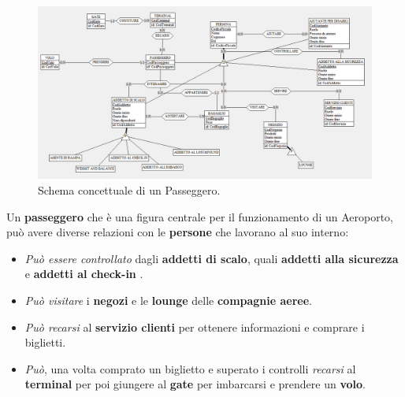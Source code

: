 \begin{figure}[H] 
	\centering
	\includegraphics[width=1.2\textwidth, height=1.2\textheight, keepaspectratio]{./img/Schema_Concettuale/Passeggero.png}
	\caption{Schema concettuale di un Passeggero.}
	\label{fig:schema_passeggero}
\end{figure}

\pagebreak

\textsf{Un \textbf{passeggero} che è una figura centrale per il funzionamento di un Aeroporto, può avere diverse relazioni con le \textbf{persone} che lavorano al suo interno:}\\

\begin{itemize}
	\item \textsf{\small \emph{Può essere controllato} dagli \textbf{addetti di scalo}, quali \textbf{addetti alla sicurezza} e \textbf{addetti al check-in} .}\\
	\item \textsf{\small \emph{Può visitare} i \textbf{negozi} e le \textbf{lounge} delle \textbf{compagnie aeree}}.\\
	\item \textsf{\small \emph{Può recarsi} al \textbf{servizio clienti} per ottenere informazioni e comprare i biglietti.}\\
	\item \textsf{\small \emph{Può}, una volta comprato un biglietto e superato i controlli \emph{recarsi} al \textbf{terminal} per poi giungere al \textbf{gate} per imbarcarsi e prendere un \textbf{volo}.}\\
\end{itemize}

